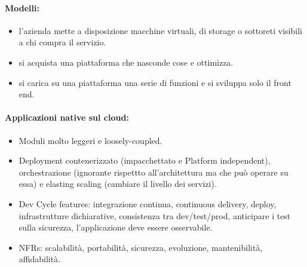 
\paragraph{Modelli:}

\begin{itemize}
  \item {} l'azienda mette a disposizione macchine virtuali, di storage o sottoreti visibili a chi compra il servizio. 
  \item {} si acquista una piattaforma che nasconde cose e ottimizza. 
  \item {} si carica su una piattaforma una serie di funzioni e si sviluppa solo il front end.
\end{itemize}

\paragraph{Applicazioni native sul cloud:}

\begin{itemize}
  \item Moduli molto leggeri e loosely-coupled. 
  \item Deployment contenerizzato (impacchettato e Platform independent), orchestrazione (ignorante rispettto all'architettura ma che può operare su essa) e elasting scaling (cambiare il livello dei servizi). 
  \item Dev Cycle features: integrazione continua, continuous delivery, deploy, infrastrutture dichiarative, consistenza tra dev/test/prod, anticipare i test sulla sicurezza, l'applicazione deve essere osservabile. 
  \item NFRs: scalabilità, portabilità, sicurezza, evoluzione, mantenibilità, affidabilità.
\end{itemize}


